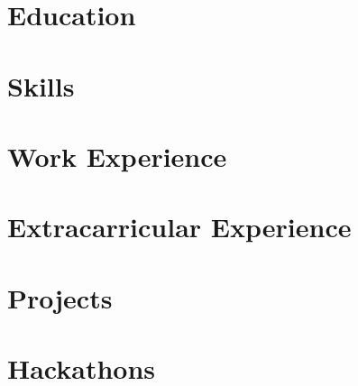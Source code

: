 \documentclass[letter,10pt]{article}
\begin{document}
% 

\section{Education}


\section{Skills}


\section{Work Experience}


\section{Extracarricular Experience}


\section{Projects}


\section{Hackathons}





\end{document}
